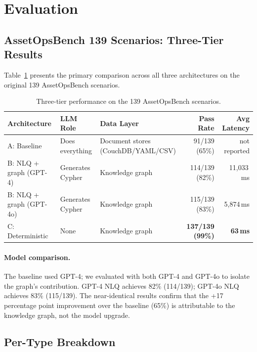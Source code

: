 \documentclass[11pt]{article}
\begin{document}
\section{Evaluation}
\label{sec:evaluation}

\subsection{AssetOpsBench 139 Scenarios: Three-Tier Results}

Table~\ref{tab:main-results} presents the primary comparison across all three architectures on the original 139 AssetOpsBench scenarios.

\begin{table}[t]
  \centering
  \caption{Three-tier performance on the 139 AssetOpsBench scenarios.}
  \label{tab:main-results}
  \begin{tabular}{@{}lllrr@{}}
    \toprule
    \textbf{Architecture} & \textbf{LLM Role} & \textbf{Data Layer} & \textbf{Pass Rate} & \textbf{Avg Latency} \\
    \midrule
    A: Baseline          & Does everything     & Document stores (CouchDB/YAML/CSV) & 91/139 (65\%)  & not reported \\
    B: NLQ + graph (GPT-4)  & Generates Cypher & Knowledge graph        & 114/139 (82\%) & 11{,}033\,ms \\
    B: NLQ + graph (GPT-4o) & Generates Cypher & Knowledge graph        & 115/139 (83\%) & 5{,}874\,ms \\
    C: Deterministic     & None                & Knowledge graph         & \textbf{137/139 (99\%)} & \textbf{63\,ms} \\
    \bottomrule
  \end{tabular}
\end{table}

\paragraph{Model comparison.} The baseline used GPT-4; we evaluated with both GPT-4 and GPT-4o to isolate the graph's contribution. GPT-4 NLQ achieves 82\% (114/139); GPT-4o NLQ achieves 83\% (115/139). The near-identical results confirm that the +17 percentage point improvement over the baseline (65\%) is attributable to the knowledge graph, not the model upgrade.

\subsection{Per-Type Breakdown}
\end{document}
